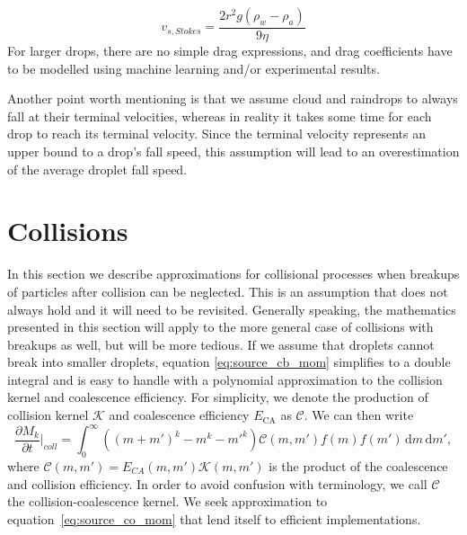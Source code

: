 \documentclass{report}
\begin{document}
\begin{equation}
    v_{s, Stokes} = \frac{2 r^2 g (\rho_w - \rho_a)}{9 \eta}
\label{eq:settling_velocity_stokes}
\end{equation}
For larger drops, there are no simple drag expressions, and drag coefficients have to be modelled using machine learning and/or experimental results.

Another point worth mentioning is that we assume cloud and raindrops to always fall at their terminal velocities, whereas in reality it takes some time for each drop to reach its terminal velocity. Since the terminal velocity represents an upper bound to a drop's fall speed, this assumption will lead to an overestimation of the average droplet fall speed.

\section{Collisions}
In this section we describe approximations for collisional processes when breakups of particles after collision can be neglected. This is an assumption that does not always hold and it will need to be revisited. Generally speaking, the mathematics presented in this section will apply to the more general case of collisions with breakups as well, but will be more tedious. If we assume that droplets cannot break into smaller droplets, equation \eqref{eq:source_cb_mom} simplifies to a double integral and is easy to handle with a polynomial approximation to the collision kernel and coalescence efficiency. For simplicity, we denote the production of collision kernel $\mathcal{K}$ and coalescence efficiency $E_\mathrm{CA}$ as $\mathcal{C}$. We can then write
\begin{equation}
    \frac{\partial M_k}{\partial t} \biggr\rvert_{coll} = \int_0^\infty \left((m+m')^k - m^k - {m'}^k\right) \mathcal{C}(m, m')f(m)f(m') \, \text{d}m\, \text{d}m',
\label{eq:source_co_mom}
\end{equation}
where $\mathcal{C}(m, m') = E_{CA}(m, m') \mathcal{K}(m, m')$ is the product of the coalescence and collision efficiency. In order to avoid confusion with terminology, we call $\mathcal{C}$ the collision-coalescence kernel. We seek approximation to equation~\eqref{eq:source_co_mom} that lend itself to efficient implementations.
\end{document}
